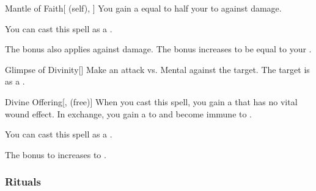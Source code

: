\lowercase{\hypertarget{spell:Mantle of Faith}{}}\label{spell:Mantle of Faith}
\begin{attuneability}[Rank 4]{\hypertarget{spell:Mantle of Faith}{Mantle of Faith}}[ (self), ]
You gain a  equal to half your  to  against  damage.

You can cast this spell as a .

\rankline
{} The bonus also applies against  damage.
 The bonus increases to be equal to your .
\end{attuneability}
\vspace{0.25em}



\lowercase{\hypertarget{spell:Glimpse of Divinity}{}}\label{spell:Glimpse of Divinity}
\begin{freeability}[Rank 5]{\hypertarget{spell:Glimpse of Divinity}{Glimpse of Divinity}}[]
Make an attack vs. Mental against the target.
\hit The target is  as a .
\end{freeability}
\vspace{0.25em}



\lowercase{\hypertarget{spell:Divine Offering}{}}\label{spell:Divine Offering}
\begin{freeability}[Rank 6]{\hypertarget{spell:Divine Offering}{Divine Offering}}[,  (free)]
When you cast this spell, you gain a  that has no vital wound effect.
In exchange, you gain a   to  and become immune to .

You can cast this spell as a .

\rankline
{} The bonus to  increases to .
\end{freeability}
\vspace{0.25em}



\subsubsection{Rituals}


